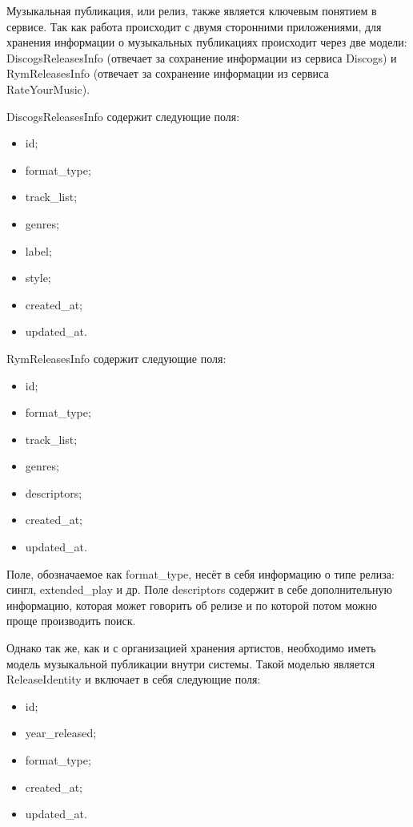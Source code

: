Музыкальная публикация, или релиз, также является ключевым понятием в сервисе. Так как работа происходит с двумя сторонними приложениями, для хранения информации о музыкальных публикациях происходит через две модели: DiscogsReleasesInfo (отвечает за сохранение информации из сервиса Discogs) и RymReleasesInfo (отвечает за сохранение информации из сервиса RateYourMusic).

DiscogsReleasesInfo содержит следующие поля:

\begin{itemize}
  \item id;
  \item format\_type;
  \item track\_list;
  \item genres;
  \item label;
  \item style;
  \item created\_at;
  \item updated\_at.
\end{itemize}

RymReleasesInfo содержит следующие поля:

\begin{itemize}
  \item id;
  \item format\_type;
  \item track\_list;
  \item genres;
  \item descriptors;
  \item created\_at;
  \item updated\_at.
\end{itemize}

Поле, обозначаемое как format\_type, несёт в себя информацию о типе релиза: сингл, extended\_play и др. Поле descriptors содержит в себе дополнительную информацию, которая может говорить об релизе и по которой потом можно проще производить поиск.

Однако так же, как и с организацией хранения артистов, необходимо иметь модель музыкальной публикации внутри системы. Такой моделью является ReleaseIdentity и включает в себя следующие поля:

\begin{itemize}
  \item id;
  \item year\_released;
  \item format\_type;
  \item created\_at;
  \item updated\_at.
\end{itemize}


